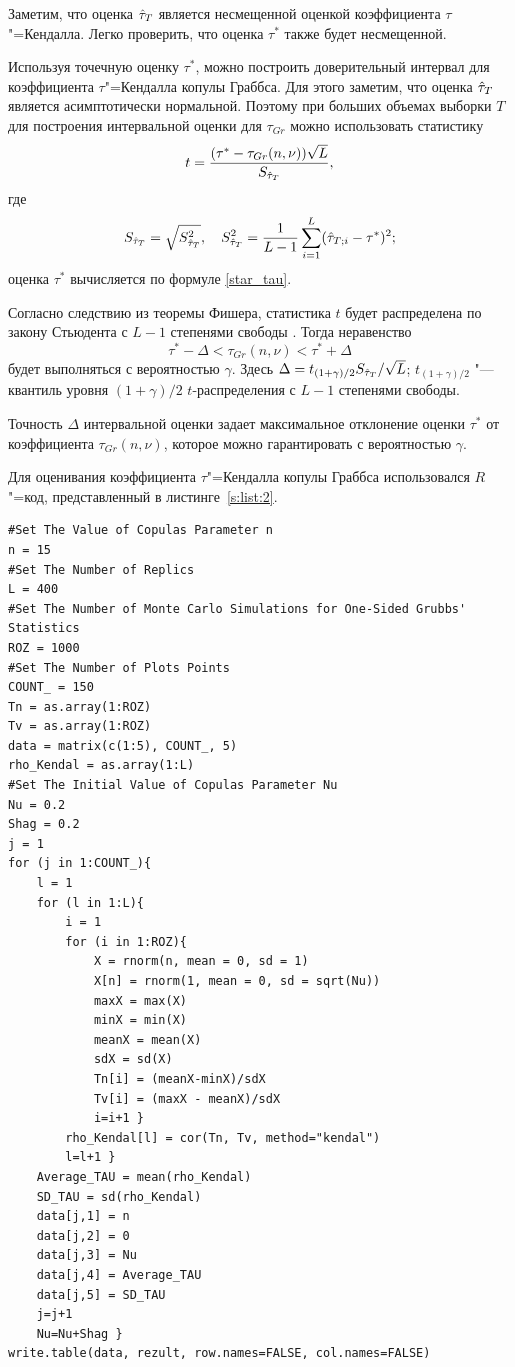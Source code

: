  Заметим, что оценка $\Hat{\tau}_{T}$ является несмещенной оценкой коэффициента $\tau$"=Кендалла. 
 Легко проверить, что оценка $\tau^{*}$ также будет несмещенной.

Используя точечную оценку  $\tau^{*}$, можно построить доверительный интервал для коэффициента 
$\tau$"=Кендалла копулы Граббса.  
Для этого заметим, что оценка $\Hat{\tau}_{T}$ является асимптотически нормальной. 
Поэтому при больших объемах выборки  $T$ для построения интервальной оценки для $\tau_{Gr}$ можно использовать статистику
 \begin{equation*}
t=\frac{(\tau^{*}-\tau_{Gr}(n,\nu))\sqrt{L}}{S_{\Hat{\tau}_T}},
\end{equation*}
где 
$$
S_{\Hat{\tau}_T}=\sqrt{S^2_{\Hat{\tau}_T}}, \quad
S^2_{\Hat{\tau}_T}=\frac{1}{L-1}\sum_{i=1}^{L}(\Hat{\tau}_{T;i}-\tau^*)^2;
$$  
оценка $\tau^*$ вычисляется по формуле \eqref{star_tau}.

Согласно следствию из теоремы Фишера, статистика $t$  будет распределена по закону Стьюдента с $L-1$ степенями свободы \cite[с.~221]{Aivazyan}.
Тогда неравенство
$$
\tau^*-\Delta<\tau_{Gr}(n,\nu)<\tau^*+\Delta
$$
будет выполняться с вероятностью $\gamma$.
Здесь $\Delta=t_{(1+\gamma)/2}S_{\Hat{\tau}_T}/\sqrt{L}$;
 $t_{(1+\gamma)/2}$ "--- квантиль уровня $(1+\gamma)/2$  $t$-распределения с $L-1$ степенями свободы.


Точность $\Delta$ интервальной оценки задает максимальное отклонение оценки $\tau^*$ от коэффициента $\tau_{Gr}(n,\nu)$, которое можно гарантировать с вероятностью $\gamma$.

Для оценивания коэффициента $\tau$"=Кендалла  копулы  Граббса использовался $R$"=код, представленный в листинге~\ref{s:list:2}.


\begin{lstlisting}[label=s:list:2, caption={Source code for  estimating Kendall's tau coefficient}]
#Set The Value of Copulas Parameter n
n = 15
#Set The Number of Replics
L = 400
#Set The Number of Monte Carlo Simulations for One-Sided Grubbs' Statistics
ROZ = 1000
#Set The Number of Plots Points
COUNT_ = 150
Tn = as.array(1:ROZ)
Tv = as.array(1:ROZ)
data = matrix(c(1:5), COUNT_, 5)
rho_Kendal = as.array(1:L)
#Set The Initial Value of Copulas Parameter Nu
Nu = 0.2
Shag = 0.2
j = 1
for (j in 1:COUNT_){
	l = 1
	for (l in 1:L){
		i = 1
		for (i in 1:ROZ){
			X = rnorm(n, mean = 0, sd = 1)
			X[n] = rnorm(1, mean = 0, sd = sqrt(Nu))
			maxX = max(X)
			minX = min(X)
			meanX = mean(X)
			sdX = sd(X)
			Tn[i] = (meanX-minX)/sdX
			Tv[i] = (maxX - meanX)/sdX
			i=i+1 }
		rho_Kendal[l] = cor(Tn, Tv, method="kendal")
		l=l+1 }
	Average_TAU = mean(rho_Kendal)
	SD_TAU = sd(rho_Kendal)
	data[j,1] = n
	data[j,2] = 0
	data[j,3] = Nu
	data[j,4] = Average_TAU
	data[j,5] = SD_TAU
	j=j+1
	Nu=Nu+Shag }
write.table(data, rezult, row.names=FALSE, col.names=FALSE)

\end{lstlisting}


